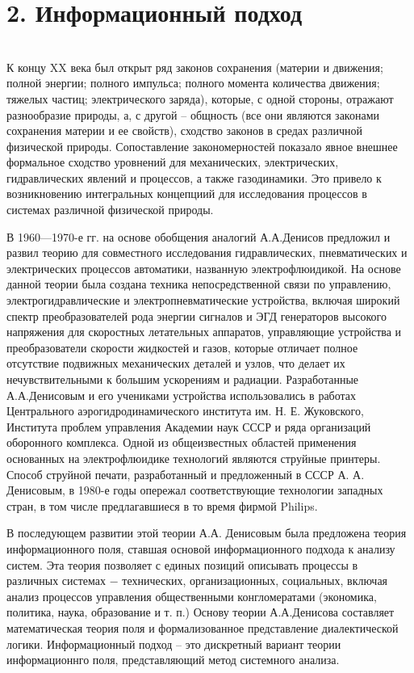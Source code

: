 \documentclass[a4paper,12pt]{report}
\begin{document}
 \chapter*{2. Информационный подход }
  \\

К концу XX века был открыт ряд законов сохранения (материи и движения; полной энергии; полного импульса; полного момента количества движения; тяжелых частиц; электрического заряда), которые, с одной стороны, отражают разнообразие природы, а, с другой – общность (все они являются законами сохранения материи и ее свойств), сходство законов в средах различной физической природы. Сопоставление закономерностей показало явное внешнее формальное сходство уровнений для механических, электрических, гидравлических явлений и процессов, а также газодинамики.  Это привело к возникновению интегральных концепциий для исследования процессов в системах различной физической природы. 

	В 1960—1970-е гг. на основе обобщения аналогий А.А.Денисов предложил и развил теорию для совместного исследования гидравлических, пневматических и электрических процессов автоматики, названную электрофлюидикой. На основе данной теории была создана техника непосредственной связи по управлению, электрогидравлические и электропневматические устройства, включая широкий спектр преобразователей рода энергии сигналов и ЭГД генераторов высокого напряжения для скоростных летательных аппаратов, управляющие устройства и преобразователи скорости жидкостей и газов, которые отличает полное отсутствие подвижных механических деталей и узлов, что делает их нечувствительными к большим ускорениям и радиации.  Разработанные А.А.Денисовым и его учениками устройства использовались в работах Центрального аэрогидродинамического
института им. Н. Е. Жуковского, Института проблем управления Академии наук СССР и ряда организаций оборонного комплекса. Одной из общеизвестных областей применения основанных на электрофлюидике технологий являются струйные принтеры. Способ струйной печати, разработанный и предложенный в СССР А. А. Денисовым, в 1980-е годы опережал соответствующие технологии западных стран, в том числе предлагавшиеся в то время фирмой Philips.

	В последующем развитии этой теории А.А. Денисовым была предложена теория информационного поля, ставшая основой информационного подхода к анализу систем. Эта теория позволяет с единых позиций описывать процессы в различных системах − технических, организационных, социальных, включая анализ процессов управления общественными конгломератами (экономика, политика, наука, образование и т. п.) Основу теории А.А.Денисова составляет математическая теория поля и формализованное представление диалектической логики. Информационный подход – это дискретный вариант теории информационнго поля, представляющий метод системного анализа.
	
\end{document}
